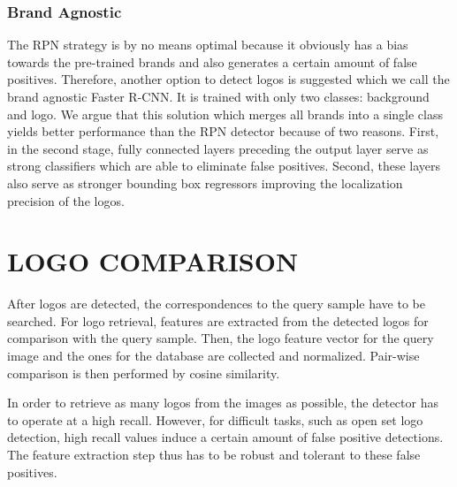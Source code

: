 \documentclass[a4paper,twoside]{article}
\begin{document}
\subsubsection*{Brand Agnostic}
The \ac{RPN} strategy is by no means optimal because it obviously has a bias towards the pre-trained brands and also generates a certain amount of false positives.
Therefore, another option to detect logos is suggested which we call the brand agnostic Faster R-CNN. It is trained with only two classes: background and logo. We argue that this solution which merges all brands into a single class yields better performance than the \ac{RPN} detector because of two reasons. 
First, in the second stage, fully connected layers preceding the output layer serve as strong classifiers which are able to eliminate false positives.
Second, these layers also serve as stronger bounding box regressors improving the localization precision of the logos.


\section{\uppercase{Logo Comparison}}
\noindent After logos are detected, the correspondences to the query sample have to be searched. 
For logo retrieval, features are extracted from the detected logos for comparison with the query sample. Then, the logo feature vector for the query image and the ones for the database are collected and normalized. Pair-wise comparison is then performed by cosine similarity.

In order to retrieve as many logos from the images as possible, the detector has to operate at a high recall. However, for difficult tasks, such as open set logo detection, high recall values induce a certain amount of false positive detections. The feature extraction step thus has to be robust and tolerant to these false positives. 
%
%
%
\end{document}
